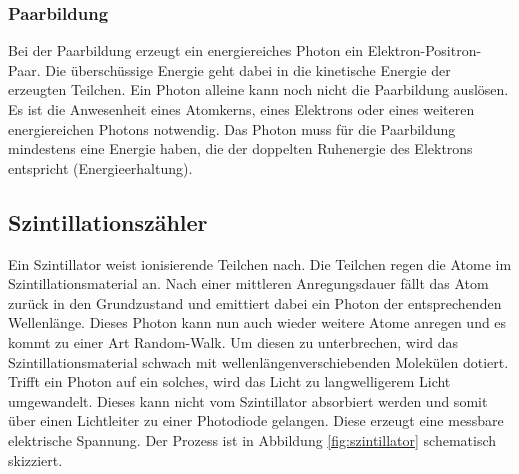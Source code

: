 \subsubsection{Paarbildung}
Bei der Paarbildung erzeugt ein energiereiches Photon ein Elektron-Positron-Paar. Die überschüssige Energie geht dabei in die kinetische Energie der erzeugten Teilchen. Ein Photon alleine kann noch nicht die Paarbildung auslösen. Es ist die Anwesenheit eines Atomkerns, eines Elektrons oder eines weiteren energiereichen Photons notwendig. Das Photon muss für die Paarbildung mindestens eine Energie haben, die der doppelten Ruhenergie des Elektrons entspricht (Energieerhaltung).

\subsection{Szintillationszähler}
Ein Szintillator weist ionisierende Teilchen nach. Die Teilchen regen die Atome im Szintillationsmaterial an. Nach einer mittleren Anregungsdauer fällt das Atom zurück in den Grundzustand und emittiert dabei ein Photon der entsprechenden Wellenlänge. Dieses Photon kann nun auch wieder weitere Atome anregen und es kommt zu einer Art Random-Walk. Um diesen zu unterbrechen, wird das Szintillationsmaterial schwach mit wellenlängenverschiebenden Molekülen dotiert. Trifft ein Photon auf ein solches, wird das Licht zu langwelligerem Licht umgewandelt. Dieses kann nicht vom Szintillator absorbiert werden und somit über einen Lichtleiter zu einer Photodiode gelangen. Diese erzeugt eine messbare elektrische Spannung. Der Prozess ist in Abbildung \ref{fig:szintillator} schematisch skizziert.
